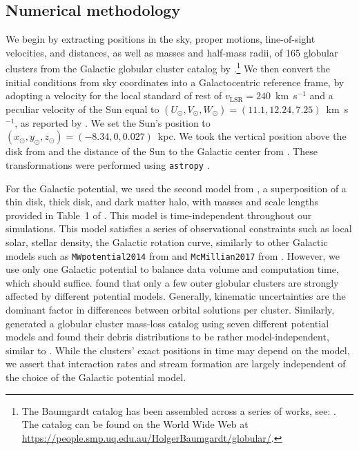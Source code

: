 \documentclass{aa}
\begin{document}
  \subsection{Numerical methodology}\label{numerical_meth}
    We begin by extracting positions in the sky, proper motions, line-of-sight velocities, and distances, as well as masses and half-mass radii, of 165 globular clusters from the Galactic globular cluster catalog by \cite{2021MNRAS.505.5957B}.\footnote{The Baumgardt catalog has been assembled across a series of works, see: \cite{2020PASA...37...46B,2019MNRAS.482.5138B,2018MNRAS.478.1520B}. The catalog can be found on the World Wide Web at \href{https://people.smp.uq.edu.au/HolgerBaumgardt/globular/}{https://people.smp.uq.edu.au/HolgerBaumgardt/globular/}.} We then convert the initial conditions from sky coordinates into a Galactocentric reference frame, by adopting a velocity for the local standard of rest of $v_{\text{LSR}} = 240$~km~s$^{-1}$ and a peculiar velocity of the Sun equal to $(U_\odot, V_\odot, W_\odot)=(11.1, 12.24, 7.25)$~km~s$^{-1}$, as reported by \citet{2012MNRAS.427..274S}.  We set the Sun's position to $(x_\odot,y_\odot,z_\odot) = (-8.34,0,0.027)$~kpc. We took the vertical position above the disk from \citet{2001ApJ...553..184C} and the distance of the Sun to the Galactic center from \citet{2014ApJ...783..130R}. These transformations were performed using \texttt{astropy} \citep{2013A&A...558A..33A}.

    For the Galactic potential, we used the second model from \citet{2017A&A...598A..66P}, a superposition of a thin disk, thick disk, and dark matter halo, with masses and scale lengths provided in Table~1 of \citet{2023A&A...673A..44F}. This model is time-independent throughout our simulations. This model satisfies a series of observational constraints such as local solar, stellar density, the Galactic rotation curve, similarly to other Galactic models such as \texttt{MWpotential2014} from \citet{2015ApJS..216...29B} and \texttt{McMillian2017} from \citet{2017MNRAS.465...76M}. However, we use only one Galactic potential to balance data volume and computation time, which should suffice. \citet{2021MNRAS.505.5978V} found that only a few outer globular clusters are strongly affected by different potential models. Generally, kinematic uncertainties are the dominant factor in differences between orbital solutions per cluster. Similarly, \citet{2024MNRAS.528.5189G} generated a globular cluster mass-loss catalog using seven different potential models and found their debris distributions to be rather model-independent, similar to \citet{2023A&A...673A..44F}. While the clusters' exact positions in time may depend on the model, we assert that interaction rates and stream formation are largely independent of the choice of the Galactic potential model.
    
\end{document}
